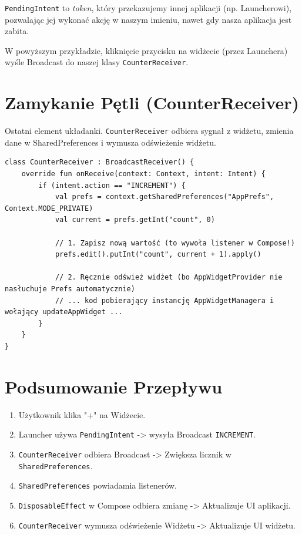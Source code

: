 \texttt{PendingIntent} to \textit{token}, który przekazujemy innej aplikacji (np. Launcherowi), pozwalając jej wykonać akcję w naszym imieniu, nawet gdy nasza aplikacja jest zabita.

W powyższym przykładzie, kliknięcie przycisku na widżecie (przez Launchera) wyśle Broadcast do naszej klasy \texttt{CounterReceiver}.

\section{Zamykanie Pętli (CounterReceiver)}

Ostatni element układanki. \texttt{CounterReceiver} odbiera sygnał z widżetu, zmienia dane w SharedPreferences i wymusza odświeżenie widżetu.

\begin{verbatim}
class CounterReceiver : BroadcastReceiver() {
    override fun onReceive(context: Context, intent: Intent) {
        if (intent.action == "INCREMENT") {
            val prefs = context.getSharedPreferences("AppPrefs", Context.MODE_PRIVATE)
            val current = prefs.getInt("count", 0)
            
            // 1. Zapisz nową wartość (to wywoła listener w Compose!)
            prefs.edit().putInt("count", current + 1).apply()

            // 2. Ręcznie odśwież widżet (bo AppWidgetProvider nie nasłuchuje Prefs automatycznie)
            // ... kod pobierający instancję AppWidgetManagera i wołający updateAppWidget ...
        }
    }
}
\end{verbatim}

\section{Podsumowanie Przepływu}
\begin{enumerate}
    \item Użytkownik klika "+" na Widżecie.
    \item Launcher używa \texttt{PendingIntent} -> wysyła Broadcast \texttt{INCREMENT}.
    \item \texttt{CounterReceiver} odbiera Broadcast -> Zwiększa licznik w \texttt{SharedPreferences}.
    \item \texttt{SharedPreferences} powiadamia listenerów.
    \item \texttt{DisposableEffect} w Compose odbiera zmianę -> Aktualizuje UI aplikacji.
    \item \texttt{CounterReceiver} wymusza odświeżenie Widżetu -> Aktualizuje UI widżetu.
\end{enumerate}

